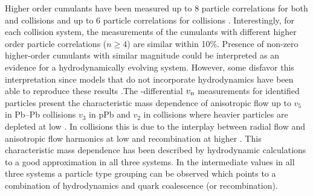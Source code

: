 \documentclass[../report.tex]{subfiles}
\begin{document}
Higher order cumulants have been measured up to 8 particle correlations for both \PbPb and \pPb collisions and up to 6 particle correlations for \pp collisions \cite{Aad:2013fja,Chatrchyan:2013nka,Khachatryan:2016txc,Aamodt:2010pa,ALICE:2011ab,Chatrchyan:2012ta,Abelev:2014mda,Chatrchyan:2013kba,Aad:2014vba,Khachatryan:2015waa,Adam:2016izf,CMS:2015ica,Sirunyan:2017pan,Sirunyan:2017igb,Aaboud:2017acw,Aaboud:2017blb}. Interestingly, for each collision system, the measurements of the cumulants with different higher order particle correlations ($n \geq 4$) are similar within 10\%. Presence of non-zero higher-order cumulants with similar magnitude could be interpreted as an evidence for a hydrodynamically evolving system. However, some disfavor this interpretation since models that do not incorporate hydrodynamics have been able to reproduce these results \cite{Sjostrand:2006za,Jia:2014pza,Gyulassy:2014cfa,McLerran:2014uka}.The \pt-differential $v_{\rm{n}}$ measurements for identified particles present the characteristic mass dependence of anisotropic flow up to $v_{5}$ in Pb--Pb collisions $v_{3}$ in pPb and $v_{2}$ in \pp collisions where heavier particles are depleted at low \pt \cite{Abelev:2014pua,Abelev:2012di,Adam:2016nfo,Khachatryan:2014jra,ABELEV:2013wsa,CMS:2015kua,Khachatryan:2016txc,Acharya:2018zuq}. In \PbPb collisions this is due to the interplay between radial flow and anisotropic flow harmonics at low \pt and recombination at higher \pt. This characteristic mass dependence has been described by hydrodynamic calculations to a good approximation in all three systems. In the intermediate \pt values in all three systems a particle type grouping can be observed which points to a combination of hydrodynamics and quark coalescence (or recombination).
\end{document}
